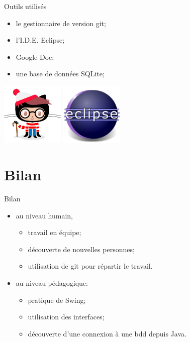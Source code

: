 \documentclass{beamer}
\begin{document}
\begin{frame}{Outils utilisés}

	\begin{itemize}
		\item le gestionnaire de version git;
		\item l'I.D.E. Eclipse;
		\item Google Doc;
		\item une base de données SQLite;
	\end{itemize}
	
	\begin{center}
		\includegraphics[width=3cm]{waldocat.jpg} \hspace*{0.5cm}
		\includegraphics[width=3cm]{eclipse.png}
	\end{center}

\end{frame}

\section{Bilan}

\begin{frame}{Bilan}

	\begin{itemize}
		\item au niveau humain,
		\begin{itemize}
			\item travail en équipe;
			\item découverte de nouvelles personnes;
			\item utilisation de git pour répartir le travail.
		\end{itemize}		
		\vspace*{0.5cm}
		\item au niveau pédagogique:
		\begin{itemize}
			\item pratique de Swing;
			\item utilisation des interfaces;
			\item découverte d'une connexion à une bdd depuis Java.
		\end{itemize}
	\end{itemize}

\end{frame}
\end{document}
